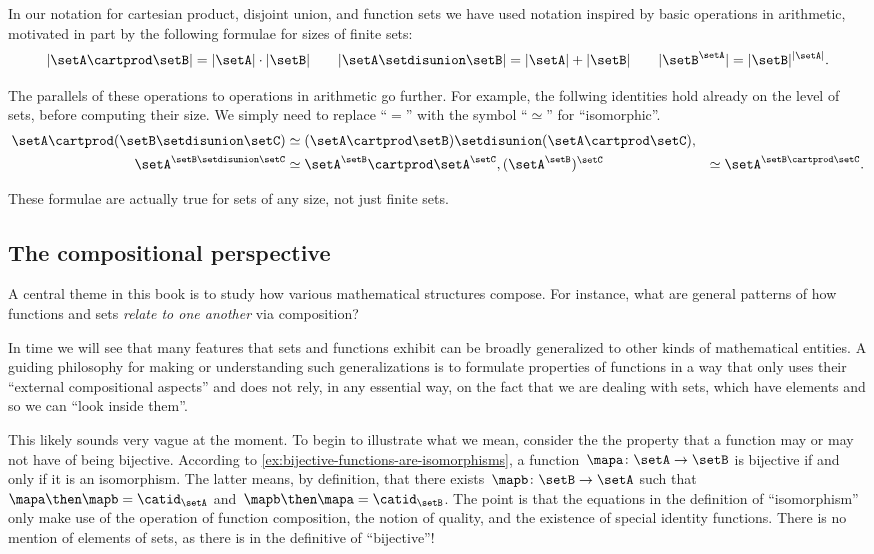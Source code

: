 In our notation for cartesian product, disjoint union, and function sets we have used notation inspired by basic operations in arithmetic, motivated in part by the following formulae for sizes of finite sets:
\begin{equation}
    \vert \setA \cartprod \setB \vert = \vert \setA \vert \cdot \vert \setB \vert \qquad \vert \setA \setdisunion \setB \vert = \vert \setA \vert + \vert \setB \vert \qquad \vert \setB^{\setA} \vert = \vert \setB \vert^{\vert \setA \vert}.
\end{equation}

The parallels of these operations to operations in arithmetic go further.
For example, the follwing identities hold already on the level of sets, before computing their size.
We simply need to replace ``$=$'' with the symbol ``$\simeq$'' for ``isomorphic''.
\begin{align}
    \setA \cartprod (\setB \setdisunion \setC) & \simeq (\setA \cartprod \setB) \setdisunion (\setA \cartprod \setC), \\
    \setA^{\setB \setdisunion \setC}           & \simeq \setA^\setB \cartprod \setA^\setC,
    (\setA^\setB)^\setC                        & \simeq \setA^{\setB \cartprod \setC}.
\end{align}

These formulae are actually true for sets of any size, not just finite sets.

\subsection{The compositional perspective}

A central theme in this book is to study how various mathematical structures compose.
For instance, what are general patterns of how functions and sets \emph{relate to one another} via composition?

In time we will see that many features that sets and functions exhibit can be broadly generalized to other kinds of mathematical entities.
A guiding philosophy for making or understanding such generalizations is to formulate properties of functions in a way that only uses their ``external compositional aspects'' and does not rely, in any essential way, on the fact that we are dealing with sets, which have elements and so we can ``look inside them''.

This likely sounds very vague at the moment.
To begin to illustrate what we mean, consider the the property that a function may or may not have of being bijective.
According to \cref{ex:bijective-functions-are-isomorphisms}, a function~$\mapa\colon \setA \to \setB$ is bijective if and only if it is an isomorphism.
The latter means, by definition, that there exists~$\mapb \colon \setB \to \setA$ such that~$\mapa \then \mapb = \catid_\setA$ and~$\mapb \then \mapa = \catid_\setB$.
The point is that the equations in the definition of ``isomorphism'' only make use of the operation of function composition, the notion of quality, and the existence of special identity functions.
There is no mention of elements of sets, as there is in the definitive of ``bijective''!


